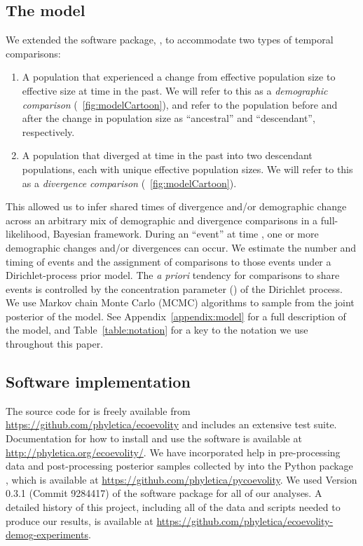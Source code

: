 % 
\subsection{The model}

We extended the software package, \ecoevolity, to accommodate two types of
temporal comparisons:
\begin{enumerate}
    \item A population that experienced a change from effective population size
        \epopsize[\rootpopindex]
        to effective size
        \epopsize[\descendantpopindex{}]
        at time \comparisonetime in the past.
        We will refer to this as a \emph{demographic comparison}
        (\fig{}~\ref{fig:modelCartoon}),
        and refer to the population before and after the change in population
        size as ``ancestral'' and ``descendant'', respectively.
    \item A population that diverged at time \comparisonetime in the past into
        two descendant populations, each with unique effective population
        sizes.
        We will refer to this as a \emph{divergence comparison}
        (\fig{}~\ref{fig:modelCartoon}).
\end{enumerate}
This allowed us to infer shared times of divergence and/or demographic change
across an arbitrary mix of demographic and divergence comparisons in a
full-likelihood, Bayesian framework.
During an ``event'' at time \etime, one or more demographic changes and/or
divergences can occur.
We estimate the number and timing of events and the assignment of comparisons
to those events under a Dirichlet-process \citep{Ferguson1973,Antoniak1974}
prior model.
The \emph{a priori} tendency for comparisons to share events is controlled by
the concentration parameter (\concentration) of the Dirichlet process.
We use Markov chain Monte Carlo (MCMC) algorithms
\citep{Metropolis1953,Hastings1970,Neal2000}
to sample from the joint posterior of the model.
See Appendix~\ref{appendix:model} for a full description of the model, and
Table~\ref{table:notation} for a key to the notation we use throughout this
paper.

\subsection{Software implementation}
The \cpp source code for \ecoevolity is freely available from
\url{https://github.com/phyletica/ecoevolity} and includes an extensive test
suite.
Documentation for how to install and use the software is available at
\url{http://phyletica.org/ecoevolity/}.
We have incorporated help in pre-processing data and post-processing posterior
samples collected by \ecoevolity into the Python package \pycoevolity, which is
available at
\url{https://github.com/phyletica/pycoevolity}.
We used Version 0.3.1
(Commit 9284417)
of the \ecoevolity software package for all of our analyses.
A detailed history of this project, including all of the data and scripts
needed to produce our results, is available at
\url{https://github.com/phyletica/ecoevolity-demog-experiments}.


